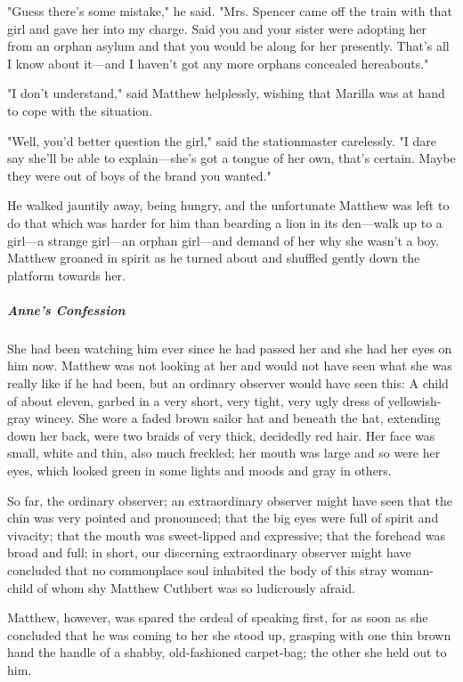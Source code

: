 \documentclass{article}
\begin{document}
"Guess there's some mistake," he said. "Mrs. Spencer came off the train with that girl and gave her into my charge. Said you and your sister were adopting her from an orphan asylum and that you would be along for her presently. That's all I know about it---and I haven't got any more orphans concealed hereabouts."

"I don't understand," said Matthew helplessly, wishing that Marilla was at hand to cope with the situation.

"Well, you'd better question the girl," said the stationmaster carelessly. "I dare say she'll be able to explain---she's got a tongue of her own, that's certain. Maybe they were out of boys of the brand you wanted."

He walked jauntily away, being hungry, and the unfortunate Matthew was left to do that which was harder for him than bearding a lion in its den---walk up to a girl---a strange girl---an orphan girl---and demand of her why she wasn't a boy. Matthew groaned in spirit as he turned about and shuffled gently down the platform towards her.
 
\subparagraph{Anne's Confession}
She had been watching him ever since he had passed her and she had her eyes on him now. Matthew was not looking at her and would not have seen what she was really like if he had been, but an ordinary observer would have seen this: A child of about eleven, garbed in a very short, very tight, very ugly dress of yellowish-gray wincey. She wore a faded brown sailor hat and beneath the hat, extending down her back, were two braids of very thick, decidedly red hair. Her face was small, white and thin, also much freckled; her mouth was large and so were her eyes, which looked green in some lights and moods and gray in others.

So far, the ordinary observer; an extraordinary observer might have seen that the chin was very pointed and pronounced; that the big eyes were full of spirit and vivacity; that the mouth was sweet-lipped and expressive; that the forehead was broad and full; in short, our discerning extraordinary observer might have concluded that no commonplace soul inhabited the body of this stray woman-child of whom shy Matthew Cuthbert was so ludicrously afraid.

Matthew, however, was spared the ordeal of speaking first, for as soon as she concluded that he was coming to her she stood up, grasping with one thin brown hand the handle of a shabby, old-fashioned carpet-bag; the other she held out to him.
\end{document}
